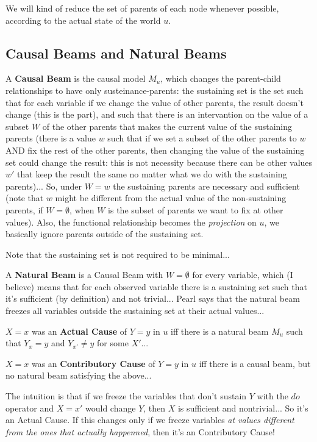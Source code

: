 We will kind of reduce the set of parents of each node whenever possible, according to the actual state of the world $u$.

\subsection{Causal Beams and Natural Beams}

A \textbf{Causal Beam} is the causal model $M_u$, which changes the parent-child relationships to have only susteinance-parents: the sustaining set is the set such that for each variable if we change the value of other parents, the result doesn't change (this is the  part), and such that there is an intervantion on the value of a subset $W$ of the other parents that makes the current value of the sustaining parents  (there is a value $w$ such that if we set a subset of the other parents to $w$ AND fix the rest of the other parents, then changing the value of the sustaining set could change the result: this is not necessity because there can be other values $w'$ that keep the result the same no matter what we do with the sustaining parents)... So, under $W=w$ the sustaining parents are necessary and sufficient (note that $w$ might be different from the actual value of the non-sustaining parents, if $W = \emptyset$, when $W$ is the subset of parents we want to fix at other values). Also, the functional relationship becomes the \textit{projection} on $u$, we basically ignore parents outside of the sustaining set.

Note that the sustaining set is not required to be minimal...

A \textbf{Natural Beam} is a Causal Beam with $W=\emptyset$ for every variable, which (I believe) means that for each observed variable there is a sustaining set such that it's sufficient (by definition) and not trivial... Pearl says that the natural beam freezes all variables outside the sustaining set at their actual values...

$X=x$ was an \textbf{Actual Cause} of $Y=y$ in $u$ iff there is a natural beam $M_u$ such that $Y_x = y$ and $Y_{x'}\neq y$ for some $X'$...

$X=x$ was an \textbf{Contributory Cause} of $Y=y$ in $u$ iff there is a causal beam, but no natural beam satisfying the above...


The intuition is that if we freeze the variables that don't sustain $Y$ with the $do$ operator and $X=x'$ would change $Y$, then $X$ is sufficient and nontrivial... So it's an Actual Cause. If this changes only if we freeze variables \textit{at values different from the ones that actually happenned}, then it's an Contributory Cause!

